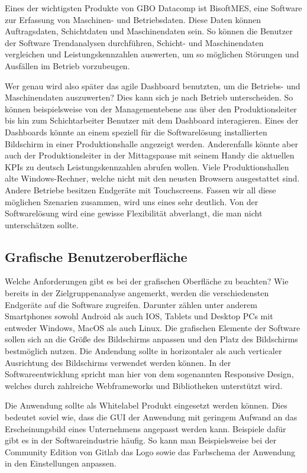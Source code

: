 Eines der wichtigsten Produkte von GBO Datacomp ist BisoftMES, eine Software zur Erfassung von
Maschinen- und Betriebsdaten. Diese Daten können Auftragsdaten, Schichtdaten und Maschinendaten sein.
So können die Benutzer der Software Trendanalysen durchführen, Schicht- und Maschinendaten vergleichen und
Leistungskennzahlen auswerten, um so möglichen Störungen und Ausfällen im Betrieb vorzubeugen.

Wer genau wird also später das agile Dashboard benutzten, um die Betriebs- und Maschinendaten
auszuwerten? Dies kann sich je nach Betrieb unterscheiden. So können beispielsweise von der
Managementebene aus über den Produktionsleiter bis hin zum Schichtarbeiter Benutzer mit dem
Dashboard interagieren. Eines der Dashboards könnte an einem speziell für die Softwarelösung
installierten Bildschirm in einer Produktionshalle angezeigt werden. Anderenfalls könnte aber
auch der Produktionsleiter in der Mittagspause mit seinem Handy die aktuellen KPIs zu deutsch
Leistungskennzahlen abrufen wollen. Viele Produktionshallen alte Windows-Rechner, welche nicht
mit den neusten Browsern ausgestattet sind. Andere Betriebe besitzen Endgeräte mit Touchscreens.
Fassen wir all diese möglichen Szenarien zusammen, wird uns eines sehr deutlich. Von der
Softwarelösung wird eine gewisse Flexibilität abverlangt, die man nicht unterschätzen sollte.

\subsection{Grafische Benutzeroberfläche}
Welche Anforderungen gibt es bei der grafischen Oberfläche zu beachten? Wie bereits
in der Zielgruppenanalyse angemerkt, werden die verschiedensten Endgeräte auf die
Software zugreifen. Darunter zählen unter anderem Smartphones sowohl Android als auch IOS,
Tablets und Desktop PCs mit entweder Windows, MacOS als auch Linux. Die grafischen Elemente
der Software sollen sich an die Größe des Bildschirms anpassen und den Platz des Bildschirms
bestmöglich nutzen. Die Andendung sollte in horizontaler als auch verticaler Ausrichtung des
Bildschirms verwendet werden können. In der Softwareentwicklung spricht man hier von dem
sogenannten Responsive Design, welches durch zahlreiche Webframeworks und Bibliotheken
unterstützt wird.

Die Anwendung sollte als Whitelabel Produkt eingesetzt werden können. Dies bedeutet soviel wie,
dass die GUI der Anwendung mit geringem Aufwand an das Erscheinungsbild eines Unternehmens angepasst
werden kann. Beispiele dafür gibt es in der Softwareindustrie häufig. So kann man Beispielsweise bei
der Community Edition von Gitlab das Logo sowie das Farbschema der Anwendung in den Einstellungen
anpassen. \cite{GitlabDocs} %

